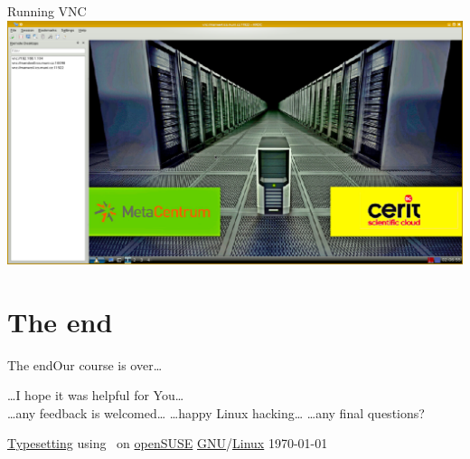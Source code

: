 \documentclass[compress, ucs, xelatex, 11pt, xcolor=svgnames,
  hyperref={
    bookmarks=true,
    unicode=true,
    colorlinks=true,
    pdftitle={Linux, command line and MetaCentrum},
    plainpages=false,
    pdfauthor={Vojtech Zeisek},
    pdfsubject={Course about use of Linux command line, writing shell scripts and using MetaCentrum of CESNET},
    pdfcreator={XeLaTeX},
    pdfkeywords={Linux, GNU, BASH, shell, command line, MetaCentrum},
    linkcolor=Red,
    anchorcolor=Blue,
    citecolor=Purple,
    filecolor=DodgerBlue,
    menucolor=DarkOrchid,
    urlcolor=DeepSkyBlue,
    pdftex},
  url={hyphens, lowtilde} %
  ]{beamer}
\begin{document}
\begin{frame}{Running VNC}
\includegraphics[width=\textwidth]{vnc.png}
\end{frame}

\section{The end}

% 
% 
% 
% 

\begin{frame}{The end}{Our course is over\ldots}
\begin{center}
  \ldots I hope it was helpful for You\ldots\\
  \vfill
  \ldots any feedback is welcomed\ldots
  \vfill
  \ldots happy Linux hacking\ldots
  \vfill
  \ldots any final questions?
  \vfill
\end{center}
\begin{flushright}
  \begin{tiny}
   \href{https://en.wikipedia.org/wiki/XeTeX}{Typesetting} using \XeLaTeX~on \href{https://www.opensuse.org/}{openSUSE} \href{https://en.wikipedia.org/wiki/GNU}{GNU}/\href{https://en.wikipedia.org/wiki/Linux}{Linux} \today
  \end{tiny}
\end{flushright}
\end{frame}
\end{document}

